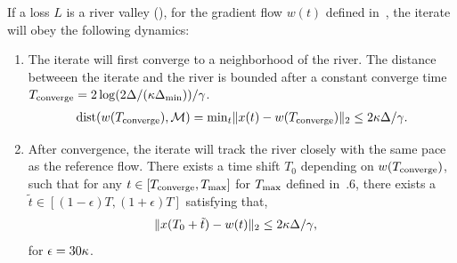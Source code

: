 \begin{theorem}
\label{thm:gftracksriver}
If a loss $L$ is a river valley (), for the gradient flow $w(t)$ defined in~, the iterate will obey the following dynamics:
\begin{enumerate}[leftmargin=*]
    \item The iterate will first converge to a neighborhood of the river. The distance betweeen the iterate and the river is bounded after a constant converge time $T_{\mathrm{converge}} = {2\log(2 \Delta / (\kappa \Delta_{\min}))}/{\gamma}$.
     \begin{align*}
        \mathrm{dist}(w(T_{\mathrm{converge}}), \mathcal{M}) =  \mathrm{min}_{t} \| x(t) - w(T_{\mathrm{converge}}) \|_2 \le 2\kappa \Delta/\gamma.
     \end{align*}
    \item After convergence, the iterate will track the river closely with the same pace as the reference flow. There exists a time shift $T_0$ depending on $w(T_{\mathrm{converge}})$, such that for any $t \in [T_{\mathrm{converge}}, T_{\mathrm{max}}]$ for $T_{\mathrm{max}}$ defined in~.6, there exists a $\tilde t \in [(1-\epsilon)T, (1+\epsilon)T]$ satisfying that,
    \begin{align*}
    \| x(T_0 + \tilde{t}) - w(t) \|_2 &\le   2\kappa\Delta/\gamma ,
    \end{align*}
    for $\epsilon = 30 \kappa$. 
\end{enumerate}
\end{theorem}

